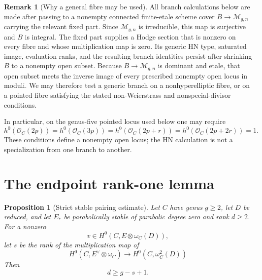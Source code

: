 \documentclass[11pt]{article}
\newtheorem{proposition}[theorem]{Proposition}
\theoremstyle{definition}
\newtheorem{remark}[theorem]{Remark}
\newcommand{\Ocal}{\mathcal O}
\newcommand{\Mcal}{\mathcal M}
\begin{document}
\begin{remark}[Why a general fibre may be used]\label{rem:general-fibre}
All branch calculations below are made after passing to a nonempty connected
finite-etale scheme cover $B\to\Mcal_{g,n}$ carrying the relevant fixed part.
Since $\Mcal_{g,n}$ is irreducible, this map is surjective and $B$ is
integral.  The fixed part supplies a Hodge section that is nonzero on every
fibre and whose multiplication map is zero.  Its generic HN type, saturated
image, evaluation ranks, and the resulting branch identities persist after
shrinking $B$ to a nonempty open subset.  Because $B\to\Mcal_{g,n}$ is
dominant and etale, that open subset meets the inverse image of every
prescribed nonempty open locus in moduli.  We may therefore test a generic
branch on a nonhyperelliptic fibre, or on a pointed fibre satisfying the
stated non-Weierstrass and nonspecial-divisor conditions.

In particular, on the genus-five pointed locus used below one may require
\[
 h^0\!\left(\Ocal_C(2p)\right)
 =h^0\!\left(\Ocal_C(3p)\right)
 =h^0\!\left(\Ocal_C(2p+r)\right)
 =h^0\!\left(\Ocal_C(2p+2r)\right)=1.
\]
These conditions define a nonempty open locus; the HN calculation is not a
specialization from one branch to another.
\end{remark}

\section{The endpoint rank-one lemma}\label{sec:endpoint}

\begin{proposition}[Strict stable pairing estimate]\label{prop:endpoint-pairing}
Let $C$ have genus $g\ge2$, let $D$ be reduced, and let $E_*$ be
parabolically stable of parabolic degree zero and rank $d\ge2$.  For a nonzero
\[
 v\in H^0(C,E\otimes\omega_C(D)),
\]
let $s$ be the rank of the multiplication map of
\cite[Proposition 5.2.3]{LLCan}
\[
 H^0(C,E^\vee\otimes\omega_C)\longrightarrow
 H^0(C,\omega_C^2(D))
\]
Then
\[
 \boxed{d\ge g-s+1.}
\]
\end{proposition}
\end{document}
